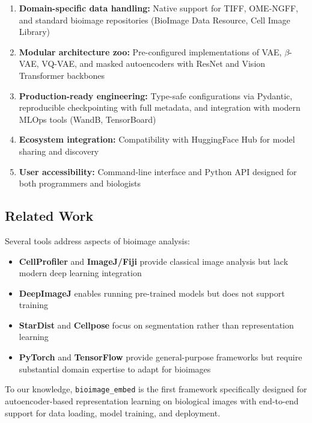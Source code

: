\begin{enumerate}
    \item \textbf{Domain-specific data handling:} Native support for TIFF, OME-NGFF, and standard bioimage repositories (BioImage Data Resource, Cell Image Library)
    \item \textbf{Modular architecture zoo:} Pre-configured implementations of VAE, $\beta$-VAE, VQ-VAE, and masked autoencoders with ResNet and Vision Transformer backbones
    \item \textbf{Production-ready engineering:} Type-safe configurations via Pydantic, reproducible checkpointing with full metadata, and integration with modern MLOps tools (WandB, TensorBoard)
    \item \textbf{Ecosystem integration:} Compatibility with HuggingFace Hub for model sharing and discovery
    \item \textbf{User accessibility:} Command-line interface and Python API designed for both programmers and biologists
\end{enumerate}

\subsection{Related Work}

Several tools address aspects of bioimage analysis:
\begin{itemize}
    \item \textbf{CellProfiler} and \textbf{ImageJ/Fiji} provide classical image analysis but lack modern deep learning integration
    \item \textbf{DeepImageJ} enables running pre-trained models but does not support training
    \item \textbf{StarDist} and \textbf{Cellpose} focus on segmentation rather than representation learning
    \item \textbf{PyTorch} and \textbf{TensorFlow} provide general-purpose frameworks but require substantial domain expertise to adapt for bioimages
\end{itemize}

To our knowledge, \texttt{bioimage\_embed} is the first framework specifically designed for autoencoder-based representation learning on biological images with end-to-end support for data loading, model training, and deployment.
